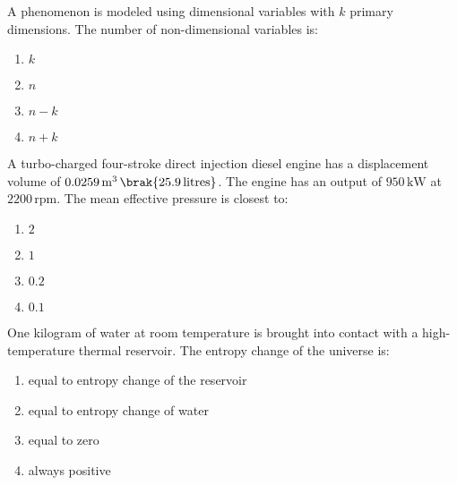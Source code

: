 \iffalse
                       
                        
                        
                        
                    
                        \author{AI24BTECH11006 - Bugada Roopansha}
                        \section{me}
                        \chapter{2010}
                        \fi

  
    \item A phenomenon is modeled using dimensional variables with $k$ primary dimensions. The number of non-dimensional variables is:
    \begin{enumerate}
        \item $k$
        \item $n$
        \item $n - k$
        \item $n + k$
    \end{enumerate}

    \item A turbo-charged four-stroke direct injection diesel engine has a displacement volume of $0.0259 \, \text{m}^3 \, \brak{25.9 \, \text{litres}}$. The engine has an output of $950 \, \text{kW}$ at $2200 \, \text{rpm}$. The mean effective pressure  is closest to:
    \begin{enumerate}
        \item $2$
        \item $1$
        \item $0.2$
        \item $0.1$
    \end{enumerate}

    \item One kilogram of water at room temperature is brought into contact with a high-temperature thermal reservoir. The entropy change of the universe is:
    \begin{enumerate}
        \item equal to entropy change of the reservoir
        \item equal to entropy change of water
        \item equal to zero
        \item always positive
    \end{enumerate}

